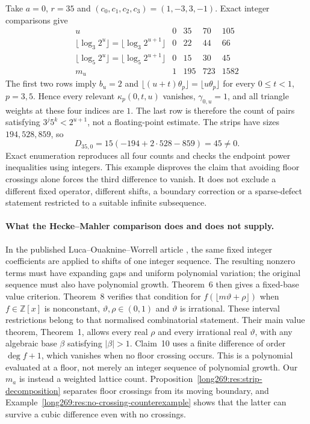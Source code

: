 \begin{example}
\label{long269:res:no-crossing-counterexample}
Take $a=0$, $r=35$ and $(c_0,c_1,c_2,c_3)=(1,-3,3,-1)$.  Exact integer
comparisons give
\[
\begin{array}{c|rrrr}
 u&0&35&70&105\\\hline
 \lfloor\log_3 2^u\rfloor=\lfloor\log_3 2^{u+1}\rfloor&0&22&44&66\\
 \lfloor\log_5 2^u\rfloor=\lfloor\log_5 2^{u+1}\rfloor&0&15&30&45\\
 m_u&1&195&723&1582
\end{array}
\]
The first two rows imply $b_u=2$ and
$\lfloor(u+t)\theta_p\rfloor=\lfloor u\theta_p\rfloor$ for every
$0\le t<1$, $p=3,5$.  Hence every relevant $\kappa_p(0,t,u)$ vanishes,
$\gamma_{0,u}=1$, and all triangle weights at these four indices are $1$.
The last row is therefore the count of pairs satisfying
$3^j5^k<2^{u+1}$, not a floating-point estimate.  The strips have sizes
$194,528,859$, so
\[
 D_{35,0}=15(-194+2\cdot528-859)=45\ne0.
\]
Exact enumeration reproduces all four counts and
checks the endpoint power inequalities using integers.  This example disproves the claim that avoiding floor crossings alone
forces the third difference to vanish.  It does not
exclude a different fixed operator, different shifts, a boundary correction
or a sparse-defect statement restricted to a suitable infinite subsequence.
\end{example}


\paragraph{What the Hecke--Mahler comparison does and does not supply.}
In the published Luca--Ouaknine--Worrell article
\cite[Definition~5 and Theorem~6]{lucaouaknineworrell2025}, the same fixed
integer coefficients are applied to shifts of one integer sequence.
The resulting nonzero terms must have expanding gaps and uniform
polynomial variation; the original sequence must also have polynomial
growth.  Theorem~6 then gives a fixed-base value criterion.  Theorem~8 verifies that
condition for $f(\lfloor m\vartheta+\rho\rfloor)$ when
$f\in\mathbb Z[x]$ is nonconstant, $\vartheta,\rho\in(0,1)$ and
$\vartheta$ is irrational.  These interval restrictions belong to that
normalised combinatorial statement.  Their main value theorem,
Theorem~1, allows every real $\rho$ and every irrational real $\vartheta$,
with any algebraic base $\beta$ satisfying $|\beta|>1$.
Claim~10 uses a finite difference of order $\deg f+1$, which vanishes
when no floor crossing occurs.  This is a polynomial evaluated at a
floor, not merely an integer sequence of polynomial growth.
Our $m_a$ is instead a weighted lattice count.  Proposition~\ref{long269:res:strip-decomposition}
separates floor crossings from its moving boundary, and
Example~\ref{long269:res:no-crossing-counterexample} shows that the latter
can survive a cubic difference even with no crossings.

